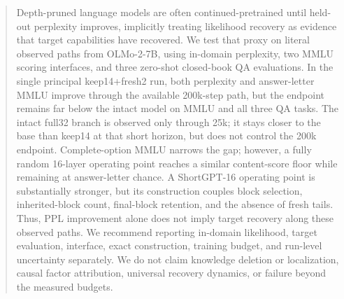 \begin{abstract}
Depth-pruned language models are often continued-pretrained until held-out
perplexity improves, implicitly treating likelihood recovery as evidence that
target capabilities have recovered. We test that proxy on literal observed
paths from OLMo-2-7B, using in-domain perplexity, two MMLU scoring interfaces,
and three zero-shot closed-book QA evaluations. In the single principal
keep14+fresh2 run, both perplexity and answer-letter MMLU improve through the
available 200k-step path, but the endpoint remains far below the intact model on
MMLU and all three QA tasks. The intact full32 branch is observed only through
25k; it stays closer to the base than keep14 at that short horizon, but does not
control the 200k endpoint. Complete-option
MMLU narrows the gap; however, a fully random 16-layer operating point reaches a
similar content-score floor while remaining at answer-letter chance. A
ShortGPT-16 operating point is substantially stronger, but its construction
couples block selection, inherited-block count, final-block retention, and the
absence of fresh tails. Thus, PPL improvement alone does not imply target
recovery along these observed paths. We recommend reporting in-domain
likelihood, target evaluation, interface, exact
construction, training budget, and run-level uncertainty separately. We do not
claim knowledge deletion or localization, causal factor attribution, universal
recovery dynamics, or failure beyond the measured budgets.
\end{abstract}
